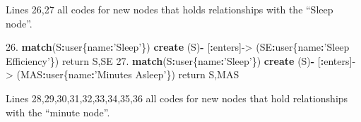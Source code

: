 \documentclass[]{book}
\newenvironment{Shaded}{\begin{snugshade}}{\end{snugshade}}
\newcommand{\KeywordTok}[1]{\textcolor[rgb]{0.13,0.29,0.53}{\textbf{#1}}}
\newcommand{\FloatTok}[1]{\textcolor[rgb]{0.00,0.00,0.81}{#1}}
\newcommand{\StringTok}[1]{\textcolor[rgb]{0.31,0.60,0.02}{#1}}
\newcommand{\OperatorTok}[1]{\textcolor[rgb]{0.81,0.36,0.00}{\textbf{#1}}}
\newcommand{\NormalTok}[1]{#1}
\begin{document}
Lines 26,27 all codes for new nodes that holds relationships with the
``Sleep node''.

\begin{Shaded}
\begin{Highlighting}[]
\FloatTok{26.}  \KeywordTok{match}\NormalTok{(S}\OperatorTok{:}\NormalTok{user\{name}\OperatorTok{:}\StringTok{'Sleep'}\NormalTok{\}) }\KeywordTok{create}\NormalTok{ (S)}\OperatorTok{-}\StringTok{ }\NormalTok{[}\OperatorTok{:}\NormalTok{enters]->}\StringTok{ }\NormalTok{(SE}\OperatorTok{:}\NormalTok{user\{name}\OperatorTok{:}\StringTok{'Sleep Efficiency'}\NormalTok{\}) return S,SE}
\FloatTok{27.} \KeywordTok{match}\NormalTok{(S}\OperatorTok{:}\NormalTok{user\{name}\OperatorTok{:}\StringTok{'Sleep'}\NormalTok{\}) }\KeywordTok{create}\NormalTok{ (S)}\OperatorTok{-}\StringTok{ }\NormalTok{[}\OperatorTok{:}\NormalTok{enters]->}\StringTok{ }\NormalTok{(MAS}\OperatorTok{:}\NormalTok{user\{name}\OperatorTok{:}\StringTok{'Minutes Asleep'}\NormalTok{\}) return S,MAS}
\end{Highlighting}
\end{Shaded}

Lines 28,29,30,31,32,33,34,35,36 all codes for new nodes that hold
relationships with the ``minute node''.
\end{document}
